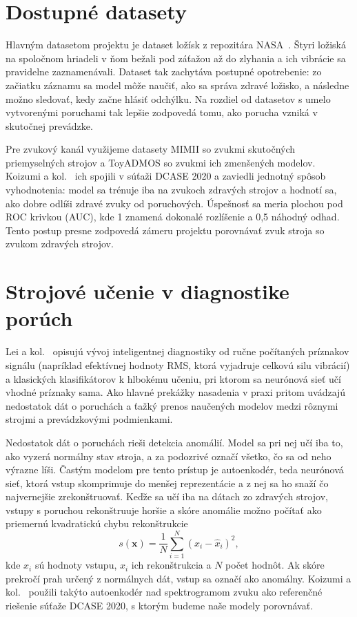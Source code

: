 \documentclass[10pt,twoside,slovak,a4paper]{article}
\begin{document}
\section{Dostupné datasety} \label{data}

Hlavným datasetom projektu je dataset ložísk z repozitára NASA~\cite{NASA:Bearing}. Štyri ložiská na spoločnom hriadeli v ňom bežali pod záťažou až do zlyhania a ich vibrácie sa pravidelne zaznamenávali. Dataset tak zachytáva postupné opotrebenie: zo začiatku záznamu sa model môže naučiť, ako sa správa zdravé ložisko, a následne možno sledovať, kedy začne hlásiť odchýlku. Na rozdiel od datasetov s umelo vytvorenými poruchami tak lepšie zodpovedá tomu, ako porucha vzniká v skutočnej prevádzke.

Pre zvukový kanál využijeme datasety MIMII so zvukmi skutočných priemyselných strojov a ToyADMOS so zvukmi ich zmenšených modelov. Koizumi a kol.~\cite{koizumi2020dcase} ich spojili v súťaži DCASE 2020 a zaviedli jednotný spôsob vyhodnotenia: model sa trénuje iba na zvukoch zdravých strojov a hodnotí sa, ako dobre odlíši zdravé zvuky od poruchových. Úspešnosť sa meria plochou pod ROC krivkou (AUC), kde 1 znamená dokonalé rozlíšenie a 0,5 náhodný odhad. Tento postup presne zodpovedá zámeru projektu porovnávať zvuk stroja so zvukom zdravých strojov.




\section{Strojové učenie v diagnostike porúch} \label{ml}

Lei a kol.~\cite{lei2020} opisujú vývoj inteligentnej diagnostiky od ručne počítaných príznakov signálu (napríklad efektívnej hodnoty RMS, ktorá vyjadruje celkovú silu vibrácií) a klasických klasifikátorov k hlbokému učeniu, pri ktorom sa neurónová sieť učí vhodné príznaky sama. Ako hlavné prekážky nasadenia v praxi pritom uvádzajú nedostatok dát o poruchách a ťažký prenos naučených modelov medzi rôznymi strojmi a prevádzkovými podmienkami.

Nedostatok dát o poruchách rieši detekcia anomálií. Model sa pri nej učí iba to, ako vyzerá normálny stav stroja, a za podozrivé označí všetko, čo sa od neho výrazne líši. Častým modelom pre tento prístup je autoenkodér, teda neurónová sieť, ktorá vstup skomprimuje do menšej reprezentácie a z nej sa ho snaží čo najvernejšie zrekonštruovať. Keďže sa učí iba na dátach zo zdravých strojov, vstupy s poruchou rekonštruuje horšie a skóre anomálie možno počítať ako priemernú kvadratickú chybu rekonštrukcie
\begin{equation}
s(\mathbf{x}) = \frac{1}{N}\sum_{i=1}^{N} \left(x_i - \hat{x}_i\right)^2 ,
\label{eq:skore}
\end{equation}
kde $x_i$ sú hodnoty vstupu, $\hat{x}_i$ ich rekonštrukcia a $N$ počet hodnôt. Ak skóre prekročí prah určený z normálnych dát, vstup sa označí ako anomálny. Koizumi a kol.~\cite{koizumi2020dcase} použili takýto autoenkodér nad spektrogramom zvuku ako referenčné riešenie súťaže DCASE 2020, s ktorým budeme naše modely porovnávať.
\end{document}
